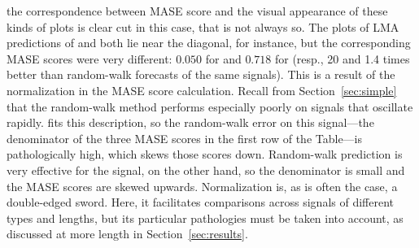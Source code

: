 the correspondence between MASE score and the visual appearance of
these kinds of plots is clear cut in this case, that is not always so.
The plots of LMA predictions of \col and \svdfive both lie near the
diagonal, for instance, but the corresponding MASE scores were very
different: $0.050$ for \col and $0.718$ for \svdfive (resp., 20 and
1.4 times better than random-walk forecasts of the same signals).
This is a result of the normalization in the MASE score calculation.
Recall from Section~\ref{sec:simple} that the random-walk method
performs especially poorly on signals that oscillate rapidly.  \col
fits this description, so the random-walk error on this signal---the
denominator of the three MASE scores in the first row of the
Table---is pathologically high, which skews those scores down.
Random-walk prediction is very effective for the \svdfive signal, on
the other hand, so the denominator is small and the MASE scores are
skewed upwards.  Normalization is, as is often the case, a double-edged
sword.  Here, it facilitates comparisons across signals of different
types and lengths, but its particular pathologies must be taken into
account, as discussed at more length in Section~\ref{sec:results}.




